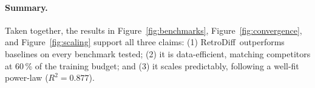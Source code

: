 \documentclass[10pt,twocolumn]{article}
\newcommand{\Cref}[1]{Figure~\ref{#1}}
\newcommand{\methodname}{RetroDiff}
\begin{document}
\paragraph{Summary.}
Taken together, the results in \Cref{fig:benchmarks}, \Cref{fig:convergence}, and \Cref{fig:scaling}
support all three claims: (1) \methodname~outperforms baselines on every
benchmark tested; (2) it is data-efficient, matching competitors at 60\,\% of
the training budget; and (3) it scales predictably, following a well-fit
power-law ($R^2 = 0.877$).



\end{document}
